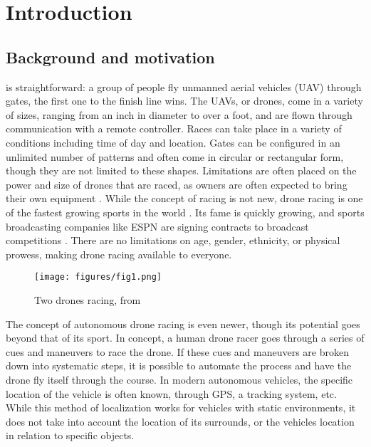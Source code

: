 \section{Introduction}
\subsection{Background and motivation}
 is straightforward: a group of people fly unmanned aerial vehicles (UAV) through gates, the first one to the finish line wins. The UAVs, or drones, come in a variety of sizes, ranging from an inch in diameter to over a foot, and are flown through communication with a remote controller. Races can take place in a variety of conditions including time of day and location. Gates can be configured in an unlimited number of patterns and often come in circular or rectangular form, though they are not limited to these shapes. Limitations are often placed on the power and size of drones that are raced, as owners are often expected to bring their own equipment \cite{redbull2018drone}. While the concept of racing is not new, drone racing is one of the fastest growing sports in the world \cite{condliffe2016is}. Its fame is quickly growing, and sports broadcasting companies like ESPN are signing contracts to broadcast competitions \cite{marshall2017espn}. There are no limitations on age, gender, ethnicity, or physical prowess, making drone racing available to everyone.
\begin{figure}[hb]
\begin{center}
\texttt{[image: figures/fig1.png]}
\end{center}
\caption{Two drones racing, from \cite{someone}}
\label{fig:1}
\end{figure}

The concept of autonomous drone racing is even newer, though its potential goes beyond that of its sport. In concept, a human drone racer goes through a series of cues and maneuvers to race the drone. If these cues and maneuvers are broken down into systematic steps, it is possible to automate the process and have the drone fly itself through the course. In modern autonomous vehicles, the specific location of the vehicle is often known, through GPS, a tracking system, etc. While this method of localization works for vehicles with static environments, it does not take into account the location of its surrounds, or the vehicles location in relation to specific objects. 

